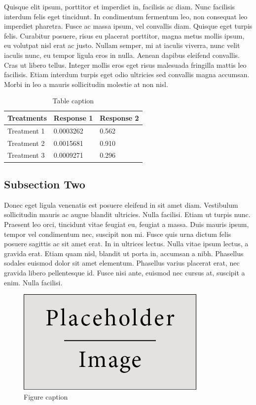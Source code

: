 \documentclass[preprint,12pt]{elsarticle}
\begin{document}
Quisque elit ipsum, porttitor et imperdiet in, facilisis ac diam. Nunc facilisis interdum felis eget tincidunt. In condimentum fermentum leo, non consequat leo imperdiet pharetra. Fusce ac massa ipsum, vel convallis diam. Quisque eget turpis felis. Curabitur posuere, risus eu placerat porttitor, magna metus mollis ipsum, eu volutpat nisl erat ac justo. Nullam semper, mi at iaculis viverra, nunc velit iaculis nunc, eu tempor ligula eros in nulla. Aenean dapibus eleifend convallis. Cras ut libero tellus. Integer mollis eros eget risus malesuada fringilla mattis leo facilisis. Etiam interdum turpis eget odio ultricies sed convallis magna accumsan. Morbi in leo a mauris sollicitudin molestie at non nisl.

\begin{table}[h]
\centering
\begin{tabular}{l l l}
\hline
\textbf{Treatments} & \textbf{Response 1} & \textbf{Response 2}\\
\hline
Treatment 1 & 0.0003262 & 0.562 \\
Treatment 2 & 0.0015681 & 0.910 \\
Treatment 3 & 0.0009271 & 0.296 \\
\hline
\end{tabular}
\caption{Table caption}
\end{table}

\subsection{Subsection Two}

Donec eget ligula venenatis est posuere eleifend in sit amet diam. Vestibulum sollicitudin mauris ac augue blandit ultricies. Nulla facilisi. Etiam ut turpis nunc. Praesent leo orci, tincidunt vitae feugiat eu, feugiat a massa. Duis mauris ipsum, tempor vel condimentum nec, suscipit non mi. Fusce quis urna dictum felis posuere sagittis ac sit amet erat. In in ultrices lectus. Nulla vitae ipsum lectus, a gravida erat. Etiam quam nisl, blandit ut porta in, accumsan a nibh. Phasellus sodales euismod dolor sit amet elementum. Phasellus varius placerat erat, nec gravida libero pellentesque id. Fusce nisi ante, euismod nec cursus at, suscipit a enim. Nulla facilisi.

\begin{figure}[h]
\centering\includegraphics[width=0.4\linewidth]{placeholder}
\caption{Figure caption}
\end{figure}
\end{document}
